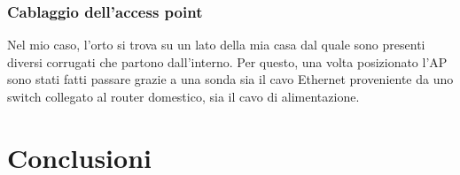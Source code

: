 \documentclass[11pt, a4paper]{article}
\begin{document}
\subsubsection{Cablaggio dell'access point}
Nel mio caso, l'orto si trova su un lato della mia casa dal quale sono presenti diversi
corrugati che partono dall'interno. Per questo, una volta posizionato l'AP sono stati
fatti passare grazie a una sonda sia il cavo Ethernet proveniente da uno switch collegato
al router domestico, sia il cavo di alimentazione.



\section{Conclusioni}
\end{document}
